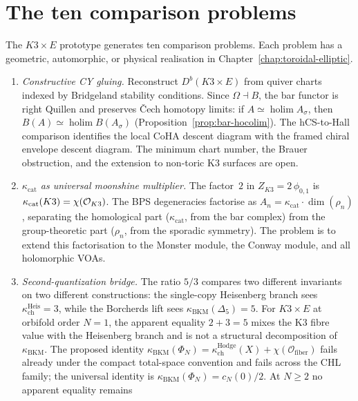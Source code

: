 \section{The ten comparison problems}
\label{sec:ten-programmes}

The \(K3\times E\) prototype generates ten comparison problems.  Each
problem has a geometric, automorphic, or physical realisation in
Chapter~\ref{chap:toroidal-elliptic}.

\begin{enumerate}[label=\textup{(\roman*)}]
\item \emph{Constructive CY gluing.}
 Reconstruct $D^b(K3 \times E)$ from quiver charts indexed by
 Bridgeland stability conditions. Since \(\Omega\dashv B\), the bar
 functor is right Quillen and preserves \v Cech homotopy limits:
 if \(A\simeq\operatorname{holim}A_\sigma\), then
 \(B(A)\simeq\operatorname{holim}B(A_\sigma)\)
 (Proposition~\ref{prop:bar-hocolim}).  The hCS-to-Hall comparison
 identifies the local CoHA descent diagram with the framed chiral
 envelope descent diagram.
 The minimum chart number, the Brauer obstruction, and the
 extension to non-toric K3 surfaces are open.
\item \emph{$\kappa_{\mathrm{cat}}$ as universal moonshine
 multiplier.}
 The factor~$2$ in $Z_{K3} = 2\,\phi_{0,1}$ is
 $\kappa_{\mathrm{cat}}(K3) = \chi(\mathcal{O}_{K3})$. The BPS
 degeneracies factorise as
 $A_n = \kappa_{\mathrm{cat}} \cdot \dim(\rho_n)$, separating
 the homological part ($\kappa_{\mathrm{cat}}$, from the bar
 complex) from the group-theoretic part ($\rho_n$, from the
 sporadic symmetry). The problem is to extend this factorisation
 to the Monster module, the Conway module, and all
 holomorphic VOAs.
\item \emph{Second-quantization bridge.}
 The ratio $5/3$ compares two different invariants on two
 different constructions: the single-copy Heisenberg branch sees
 $\kappa_{\mathrm{ch}}^{\mathrm{Heis}} = 3$, while the Borcherds
 lift sees $\kappa_{\mathrm{BKM}}(\Delta_5) = 5$.
 For $K3 \times E$ at orbifold order $N = 1$, the apparent
 equality $2+3=5$ mixes the K3 fibre value with the
 Heisenberg branch and is not a structural decomposition of
 $\kappa_{\mathrm{BKM}}$. The proposed identity
 $\kappa_{\mathrm{BKM}}(\Phi_N) =
 \kappa_{\mathrm{ch}}^{\mathrm{Hodge}}(X)+\chi(\mathcal O_{\mathrm{fiber}})$
 fails already under the compact total-space convention and
 fails across the CHL family; the universal identity is
 $\kappa_{\mathrm{BKM}}(\Phi_N)=c_N(0)/2$.
 At $N \geq 2$ no apparent equality remains

\end{enumerate}
